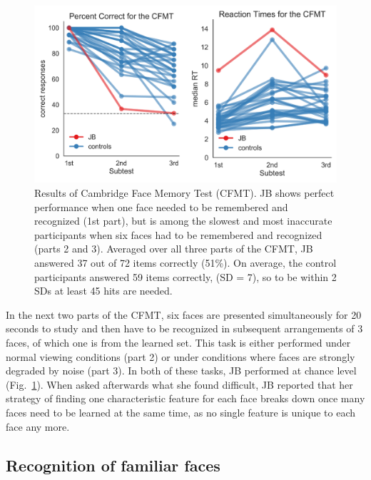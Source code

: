 \documentclass[fleqn,10pt]{SelfArx} %
\begin{document}
\begin{figure}[htbp]
	\begin{minipage}{\textwidth}
		\renewcommand{\familydefault}{\sfdefault}\normalfont
		\centering
		\includegraphics[width=\columnwidth]{../reports/figures/cambridge_main_figure.png}
		\vspace*{-3mm}
		\caption{Results of Cambridge Face Memory Test (CFMT). JB shows perfect performance when one face needed to be remembered and recognized (1st part), but is among the slowest and most inaccurate participants when six faces had to be remembered and recognized (parts 2 and 3). Averaged over all three parts of the CFMT, JB answered 37 out of 72 items correctly (51\%). On average, the control participants answered 59 items correctly, (SD = 7), so to be within 2 SDs at least 45 hits are needed.}%
		\label{fig:cfmt}
	\end{minipage}
\end{figure}

In the next two parts of the CFMT, six faces are presented simultaneously for 20 seconds to study and then have to be recognized in subsequent arrangements of 3 faces, of which one is from the learned set. This task is either performed under normal viewing conditions (part 2) or under conditions where faces are strongly degraded by noise (part 3). In both of these tasks, JB performed at chance level (Fig.~\ref{fig:cfmt}). When asked afterwards what she found difficult, JB reported that her strategy of finding one characteristic feature for each face breaks down once many faces need to be learned at the same time, as no single feature is unique to each face any more. 
 

\subsection*{Recognition of familiar faces}
\end{document}
